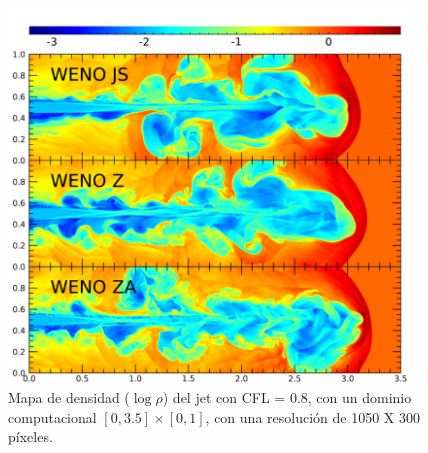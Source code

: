 \documentclass[12pt,a4paper]{book}
\begin{document}
\begin{figure}
    \begin{center}
      \includegraphics[width=0.95\textwidth]{Figuras/Introduccion/jet_ejemplo_2.png}
    \end{center}
    \caption{Mapa de densidad ($\log \rho$) del jet con CFL = 0.8, con un dominio computacional $\left[0, 3.5\right] \times \left[0, 1\right]$, con una resolución de 1050 X 300 píxeles.}
    \label{fig:jet_ejemplo_2}
\end{figure}
\end{document}
